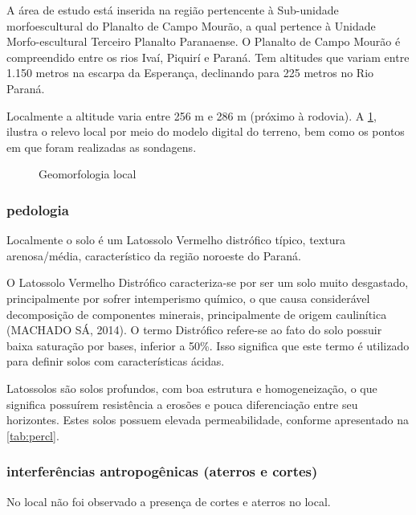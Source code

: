 A área de estudo está inserida na região pertencente à Sub-unidade morfoescultural do Planalto de Campo Mourão, a qual pertence à Unidade Morfo-escultural Terceiro Planalto Paranaense.
O Planalto de Campo Mourão é compreendido entre os rios Ivaí, Piquirí e Paraná. Tem altitudes que variam entre 1.150 metros na escarpa da Esperança, declinando para 225 metros no Rio Paraná.

Localmente a altitude varia entre 256 m e 286 m (próximo à rodovia).
A \cref{fig:geomorfologia}, ilustra o relevo local por meio do modelo digital do terreno,
bem como os pontos em que foram realizadas as sondagens.

\begin{figure}[htb!]
	\centering
	\setlength\fboxsep{0pt}
	\setlength\fboxrule{0.75pt}
	\caption{Geomorfologia local}%
	\label{fig:geomorfologia}
\end{figure}

\FloatBarrier



\subsubsection{pedologia}
Localmente o solo é um Latossolo Vermelho distrófico
típico, textura arenosa/média, característico da região noroeste do Paraná.

O Latossolo Vermelho Distrófico caracteriza-se por ser um solo muito desgastado, principalmente por sofrer intemperismo químico, o que causa considerável decomposição de componentes minerais, principalmente de origem
caulinítica (MACHADO SÁ, 2014).
O termo Distrófico refere-se ao fato do solo possuir baixa saturação por
bases, inferior a 50\%. Isso significa que este termo é utilizado para definir solos com
características ácidas.

Latossolos são solos profundos, com
boa estrutura e homogeneização, o que significa possuírem resistência a erosões e
pouca diferenciação entre seu horizontes. Estes solos possuem elevada
permeabilidade, conforme apresentado 
na \cref{tab:percl}.

\subsubsection{interferências antropogênicas (aterros e cortes)}

No local não foi observado a presença de cortes e aterros no local.

